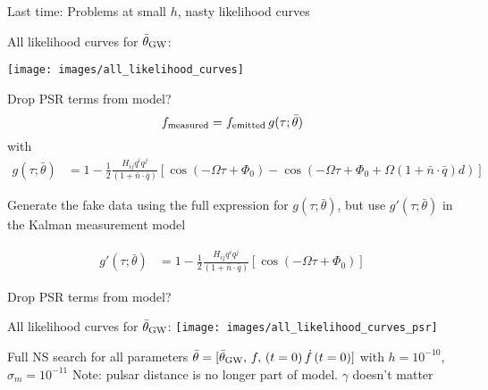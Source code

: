 \documentclass[10pt]{beamer}
\title{}
\subtitle{}
\author{}
\date{EE/GW meeting, May 19, 2023}
\begin{document}
	
	\maketitle
	
	\begin{frame}{}
		
		Last time: Problems at small $h$, nasty likelihood curves
	
	All likelihood curves for $\bar{\theta}_{\rm GW}$:

\texttt{[image: images/all\_likelihood\_curves]}


\end{frame}




\begin{frame}{Drop PSR terms from model?}
	\begin{equation}
		f_{\rm measured} = f_{\rm emitted} \, g(\tau; \bar{\theta})
		\label{eq:measureent}
	\end{equation}
	with
	\begin{align}
		g(\tau; \bar{\theta}) 
		& = 1 - \frac{1}{2} \frac{ H_{ij}q^i q^j }{(1 + \bar{n}\cdot \bar{q}) } \left[ \cos(-\Omega \tau +\Phi_0) - \cos(-\Omega \tau +\Phi_0 + \Omega (1 + \bar{n}\cdot \bar{q})  d) \right]
	\end{align}
	
	Generate the fake data using the full expression for $g(\tau; \bar{\theta})$, but use $g'(\tau; \bar{\theta})$ in the Kalman measurement model
	
	\begin{align}
		g'(\tau; \bar{\theta}) 
		& = 1 - \frac{1}{2} \frac{ H_{ij}q^i q^j }{(1 + \bar{n}\cdot \bar{q}) } \left[ \cos(-\Omega \tau +\Phi_0) \right]
	\end{align}
\end{frame}


\begin{frame}{Drop PSR terms from model?}
	
	All likelihood curves for $\bar{\theta}_{\rm GW}$:
	\texttt{[image: images/all\_likelihood\_curves\_psr]}
	
\end{frame}



\begin{frame}
	Full NS search for \alert{all parameters} \newline 
	$\bar{\theta} = [\bar{\theta}_{\rm GW}, \, f, \, (t=0) \, \dot{f} \, (t=0) ]$ \newline 
	with $h = 10^{-10}$, $\sigma_m = 10^{-11}$ \newline 
	Note: pulsar distance is no longer part of model. $\gamma$ doesn't matter
	

\end{frame}
\end{document}
